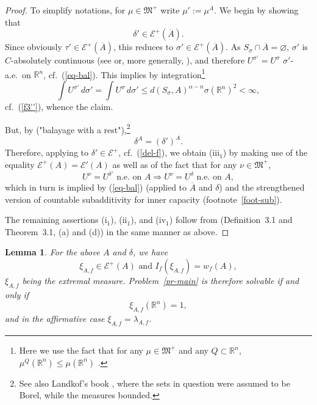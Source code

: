 \documentclass[12pt,a4paper,reqno]{amsart} %
\theoremstyle{lause}
\theoremstyle{maaritelma}
\theoremstyle{lause}
\newtheorem{lemma}[theorem]{Lemma}
\theoremstyle{maaritelma}
\numberwithin{equation}{section}
\begin{document}
 \begin{proof} To simplify notations, for $\mu\in\mathfrak M^+$ write $\mu':=\mu^{\overline{A}}$.
  We begin by showing that
  \begin{equation}\label{del-f}
 \delta'\in\mathcal E^+(\overline{A}).
\end{equation}
Since obviously $\tau'\in\mathcal E^+(\overline{A})$, this reduces to $\sigma'\in\mathcal E^+(\overline{A})$. As $S_\sigma\cap\overline{A}=\varnothing$, $\sigma'$ is $C$-ab\-s\-ol\-utely continuous (see \cite[Corollary~3.19]{FZ} or, more generally, \cite[Corollary~5.2]{Z-bal2}), and therefore
 $U^{\sigma'}=U^\sigma$ $\sigma'$-a.e.\ on $\mathbb R^n$, cf.\ (\ref{eq-bal}).
 This implies by integration\footnote{Here we use the fact that for any $\mu\in\mathfrak M^+$ and any $Q\subset\mathbb R^n$,  $\mu^Q(\mathbb R^n)\leqslant\mu(\mathbb R^n)$ \cite[Corollary~4.9]{Z-bal}.\label{f-cor}}
 \[\int U^{\sigma'}\,d\sigma'=\int U^\sigma\,d\sigma'\leqslant d(S_{\sigma},A)^{\alpha-n}\sigma(\mathbb R^n)^2<\infty,\]
 cf.\ (\ref{f3''}), whence the claim.

 But, by \cite[Corollary~4.2]{Z-bal} ("balayage with a rest"),\footnote{See also Landkof's book \cite[p.~264]{L}, where the sets in question were assumed to be Borel, while the measures bounded.}
 \[\delta^{A}=(\delta')^{A}.\]
 Therefore, applying \cite[Theorem~3.1(c)]{Z-arx-22} to $\delta'\in\mathcal E^+$, cf.\ (\ref{del-f}), we obtain (iii$_1$) by making use of the equality $\mathcal E^+(A)=\mathcal E'(A)$ as well as of the fact that for any $\nu\in\mathfrak M^+$,
 \begin{equation*}\label{impl}
 U^\nu=U^{\delta'}\text{ \ n.e.\ on $A$}\Longrightarrow U^\nu=U^\delta\text{ \ n.e.\ on $A$},
 \end{equation*}
 which in turn is implied by (\ref{eq-bal}) (applied to $\overline{A}$ and $\delta$) and the strengthened version of countable subadditivity for inner capacity (footnote~\ref{foot-sub}).

 The remaining assertions (i$_1$), (ii$_1$), and (iv$_1$) follow from \cite{Z-arx-22} (Definition~3.1 and Theorem~3.1, (a) and (d))
 in the same manner as above.
\end{proof}

\begin{lemma}\label{LL}
 For the above $A$ and $\delta$, we have
 \begin{equation}\label{ext1}
 \xi_{A,f}\in\mathcal E^+(A)\text{ \ and \ }I_f(\xi_{A,f})=w_f(A),
 \end{equation}
 $\xi_{A,f}$ being the extremal measure. Problem~{\rm\ref{pr-main}} is therefore solvable if and only if
\begin{equation}\label{ext2}\xi_{A,f}(\mathbb R^n)=1,\end{equation}
and in the affirmative case $\xi_{A,f}=\lambda_{A,f}$.
\end{lemma}
\end{document}
